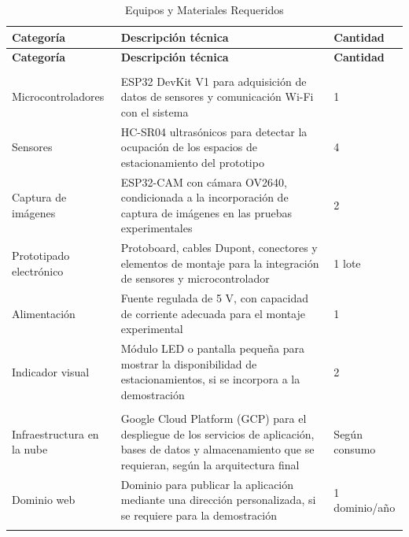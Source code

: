 \documentclass[12pt,a4paper]{article}
\begin{document}
\begingroup
\small
\begin{longtable}{@{} p{} p{} p{} @{}}
	\caption{Equipos y Materiales Requeridos} \label{tab:recursos_requeridos} \\
	\toprule
	\textbf{Categoría} & \textbf{Descripción técnica} & \textbf{Cantidad} \\
	\midrule
	\endfirsthead
	
	\toprule
	\textbf{Categoría} & \textbf{Descripción técnica} & \textbf{Cantidad} \\
	\midrule
	\endhead
	
	\bottomrule
	\endlastfoot
	
	\multicolumn{3}{l}{\textbf{Hardware IoT}} \\
	\midrule
	Microcontroladores &
	ESP32 DevKit V1 para adquisición de datos de sensores y comunicación Wi-Fi con el sistema &
	1 \\
	
	Sensores &
	HC-SR04 ultrasónicos para detectar la ocupación de los espacios de estacionamiento del prototipo &
	4 \\
	
	Captura de imágenes &
	ESP32-CAM con cámara OV2640, condicionada a la incorporación de captura de imágenes en las pruebas experimentales &
	2 \\
	
	Prototipado electrónico &
	Protoboard, cables Dupont, conectores y elementos de montaje para la integración de sensores y microcontrolador &
	1 lote \\
	
	Alimentación &
	Fuente regulada de 5 V, con capacidad de corriente adecuada para el montaje experimental &
	1 \\
	
	Indicador visual &
	Módulo LED o pantalla pequeña para mostrar la disponibilidad de estacionamientos, si se incorpora a la demostración &
	2 \\
	\addlinespace
	
	\midrule
	\multicolumn{3}{l}{\textbf{Servicios Cloud}} \\
	\midrule
	Infraestructura en la nube &
	Google Cloud Platform (GCP) para el despliegue de los servicios de aplicación, bases de datos y almacenamiento que se requieran, según la arquitectura final &
	Según consumo \\
	
	Dominio web &
	Dominio para publicar la aplicación mediante una dirección personalizada, si se requiere para la demostración &
	1 dominio/año \\
	\addlinespace
\end{longtable}
\endgroup
\end{document}
